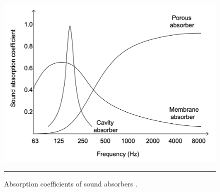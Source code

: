 \begin{figure}[htbp]
	\centering
	\includegraphics[width=.6\textwidth]{figures/Absorbers.png}
	\rule{.8\textwidth}{0.5pt} %
	\caption{Absorption coefficients of sound absorbers \citep{unit4}.}
	\label{fig:absorbers}
\end{figure}
